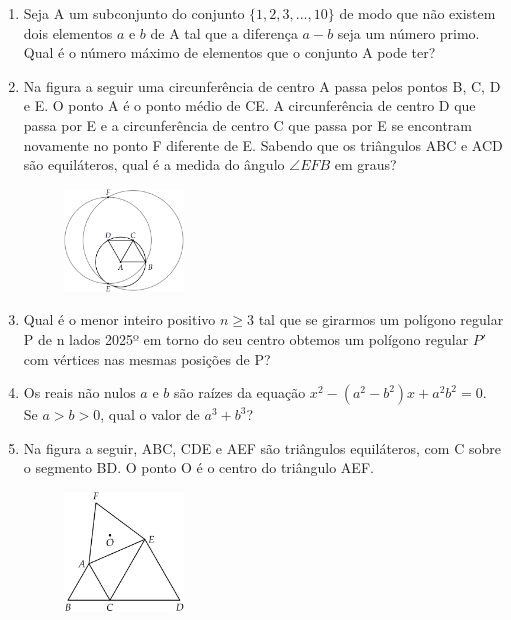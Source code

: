 \documentclass[12pt]{article}
\begin{document}
\begin{enumerate}[label=\textbf{\arabic*.}]
\begin{figure}[h]
          \end{figure}
        \item Seja A um subconjunto do conjunto \(\{1, 2, 3, \dots, 10\}\) de modo que não existem dois elementos \(a\) e \(b\) de A tal
          que a diferença \(a-b\) seja um número primo. Qual é o número máximo de elementos que o conjunto A pode ter?
        \item Na figura a seguir uma circunferência de centro A passa pelos pontos B, C, D e E. O ponto A é o ponto médio de CE. A 
          circunferência de centro D que passa por E e a circunferência de centro C que passa por E se encontram novamente no ponto F
          diferente de E. Sabendo que os triângulos ABC e ACD são equiláteros, qual é a medida do ângulo \(\angle EFB\) em graus?
          \begin{figure}[h]
            \centering
            \includegraphics[width=0.3\textwidth]{fourth.png}
          \end{figure}
        \item Qual é o menor inteiro positivo \(n \geq 3\) tal que se girarmos um polígono regular P de n lados 2025º em torno do seu centro
          obtemos um polígono regular \(P'\) com vértices nas mesmas posições de P?
        \item Os reais não nulos \(a\) e \(b\) são raízes da equação \(x^2 - (a^2-b^2)x + a^2b^2 = 0\). Se \(a > b > 0\), qual o valor de
\(a^3+b^3\)?

        \item Na figura a seguir, ABC, CDE e AEF são triângulos equiláteros, com C sobre o segmento BD. O ponto O é o centro do triângulo AEF.

          \begin{figure}[h]
            \centering
            \includegraphics[width=0.3\textwidth]{fifth.png}
          \end{figure}


\end{enumerate}
\end{document}
